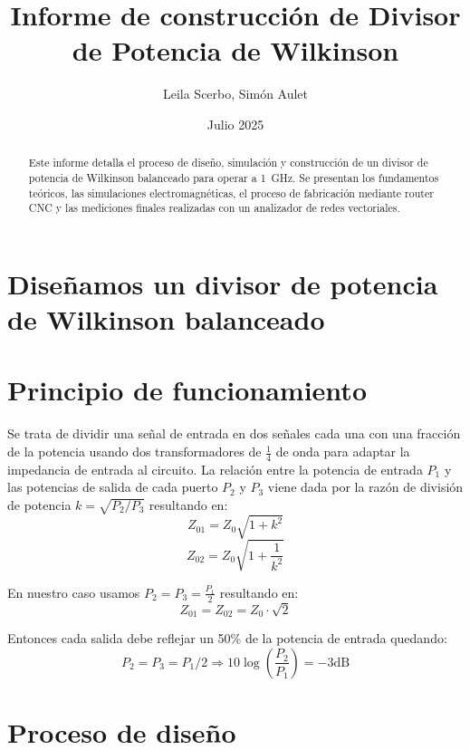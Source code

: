 \documentclass[a4paper, 12pt]{article}
\title{Informe de construcción de Divisor de Potencia de Wilkinson}
\author{Leila Scerbo, Simón Aulet}
\date{Julio 2025}
\begin{document}
\maketitle

\begin{abstract}
Este informe detalla el proceso de diseño, simulación y construcción de un divisor de potencia de Wilkinson balanceado para operar a \SI{1}{\giga\hertz}. Se presentan los fundamentos teóricos, las simulaciones electromagnéticas, el proceso de fabricación mediante router CNC y las mediciones finales realizadas con un analizador de redes vectoriales.
\end{abstract}

\section*{Diseñamos un divisor de potencia de Wilkinson balanceado}

\section*{Principio de funcionamiento}
Se trata de dividir una señal de entrada en dos señales cada una con una fracción de la potencia usando dos transformadores de $\frac{1}{4}$ de onda para adaptar la impedancia de entrada al circuito. La relación entre la potencia de entrada $P_1$ y las potencias de salida de cada puerto $P_2$ y $P_3$ viene dada por la razón de división de potencia $k = \sqrt{P_2/P_3}$ resultando en:
\begin{equation}
Z_{01} = Z_0 \sqrt{1 + k^2}
\end{equation}
\begin{equation}
Z_{02} = Z_0\sqrt{1 + \frac{1}{k^2}}
\end{equation}

En nuestro caso usamos $P_2 = P_3 = \frac{P_1}{2}$ resultando en:
\begin{equation}
Z_{01} = Z_{02} = Z_0 \cdot \sqrt{2}
\end{equation}

Entonces cada salida debe reflejar un 50\% de la potencia de entrada quedando:
\begin{equation}
P_2 = P_3 = P_1 / 2 \Rightarrow 10\log\left(\frac{P_2}{P_1}\right) = -3\text{dB}
\end{equation}

\section*{Proceso de diseño}
\end{document}
